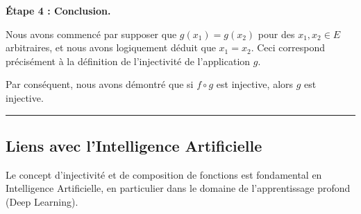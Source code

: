 \documentclass[12pt,a4paper]{report}
\begin{document}
\textbf{Étape 4 : Conclusion.}

Nous avons commencé par supposer que \(g(x_1) = g(x_2)\) pour des
\(x_1, x_2 \in E\) arbitraires, et nous avons logiquement déduit que
\(x_1 = x_2\). Ceci correspond précisément à la définition de
l'injectivité de l'application \(g\).

Par conséquent, nous avons démontré que si \(f \circ g\) est injective,
alors \(g\) est injective.

\begin{center}\rule{0.5\linewidth}{0.5pt}\end{center}

\subsection{Liens avec l'Intelligence
Artificielle}\label{liens-avec-lintelligence-artificielle}

Le concept d'injectivité et de composition de fonctions est fondamental
en Intelligence Artificielle, en particulier dans le domaine de
l'apprentissage profond (Deep Learning).
\end{document}
